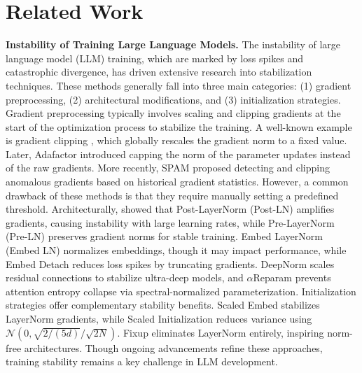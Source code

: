 \section{Related Work}
\textbf{Instability of Training Large Language Models.} 
The instability of large language model (LLM) training, which are marked by loss spikes and catastrophic divergence\citep{chowdhery2023palm,molybog2023theory}, has driven extensive research into stabilization techniques. These methods generally fall into three main categories: (1) gradient preprocessing, (2) architectural modifications, and (3) initialization strategies. Gradient preprocessing typically involves scaling and clipping gradients at the start of the optimization process to stabilize the training. A well-known example is gradient clipping \citep{goodfellow2016deep}, which globally rescales  the gradient norm to a fixed value. Later, Adafactor \citep{shazeer2018adafactor} introduced capping the norm of the parameter updates instead of the raw gradients. More recently, SPAM \citep{huang2025spam} proposed detecting and clipping anomalous gradients based on historical gradient statistics. However, a common drawback of these methods is that they require manually setting a predefined threshold. Architecturally, \citet{xiong2020layer} showed that Post-LayerNorm (Post-LN) amplifies gradients, causing instability with large learning rates, while Pre-LayerNorm (Pre-LN) preserves gradient norms for stable training. Embed LayerNorm (Embed LN) normalizes embeddings\citep{dettmers20218}, though it may impact performance\citep{scao2022language}, while Embed Detach\citep{ding2021cogview,zeng2022glm} reduces loss spikes by truncating gradients. DeepNorm\citep{wang2024deepnet} scales residual connections to stabilize ultra-deep models, and $\alpha$Reparam\citep{zhai2023stabilizing} prevents attention entropy collapse via spectral-normalized parameterization. Initialization strategies offer complementary stability benefits. Scaled Embed\citep{takase2023spike} stabilizes LayerNorm gradients, while Scaled Initialization\citep{nguyen2019transformers} reduces variance using $\mathcal{N}(0, \sqrt{2/(5d)}/\sqrt{2N})$. Fixup\citep{zhang2019fixup,huang2020improving} eliminates LayerNorm entirely, inspiring norm-free architectures. Though ongoing advancements refine these approaches, training stability remains a key challenge in LLM development.



